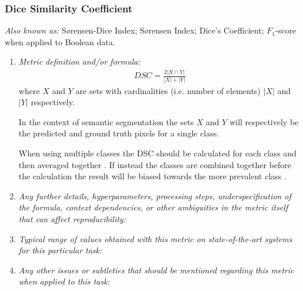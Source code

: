 \documentclass[a4paper,11pt]{article}
\begin{document}
        \subsubsection{Dice Similarity Coefficient}
            \textit{Also known as:} S{\o}rensen-Dice Index; S{\o}rensen Index; Dice's Coefficient; $F_1$-score when applied to Boolean data.
            \begin{enumerate}[label=\alph*.]
                \item \textit{Metric definition and/or formula:}
                    \begin{align}
                        DSC = \frac{2\left| X \cap Y \right|}{\left|X\right| + \left|Y\right|}
                    \end{align}
                    where $X$ and $Y$ are sets with cardinalities (i.e. number of elements) $\left|X\right|$ and $\left|Y\right|$ respectively.

                    In the context of semantic segmentation the sets $X$ and $Y$ will respectively be the predicted and ground truth pixels for a single class.

                    When using multiple classes the DSC should be calculated for each class and then averaged together \cite{azad2023loss}. If instead the classes are combined together before the calculation the result will be biased towards the more prevalent class \cite{reinke2021common}.
                \bigskip
                \item \textit{Any further details, hyperparameters, processing steps, underspecification of the formula, context dependencies, or other ambiguities in the metric itself that can affect reproducibility:}

                \bigskip
                \item \textit{Typical range of values obtained with this metric on state-of-the-art systems for this particular task:}
                \bigskip
                \item \textit{Any other issues or subtleties that should be mentioned regarding this metric when applied to this task:}
                \bigskip
            \end{enumerate}
\end{document}

